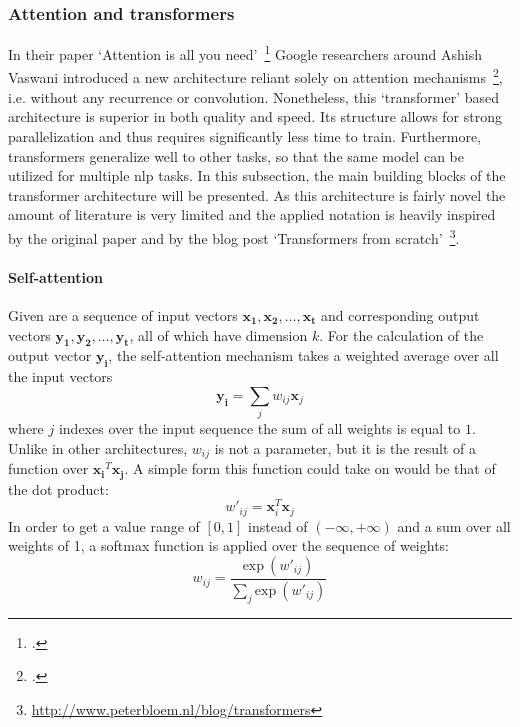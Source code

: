 \subsubsection{Attention and transformers}
\label{sub:attention_and_transformers}

In their paper `Attention is all you need'~\footcite{DBLP:journals/corr/VaswaniSPUJGKP17} Google researchers around Ashish Vaswani introduced a new architecture reliant solely on attention mechanisms~\footcite{DBLP:journals/corr/LinFSYXZB17}, i.e. without any recurrence or convolution. Nonetheless, this `transformer' based architecture is superior in both quality and speed. Its structure allows for strong parallelization and thus requires significantly less time to train. Furthermore, transformers generalize well to other tasks, so that the same model can be utilized for multiple \gls{nlp} tasks. In this subsection, the main building blocks of the transformer architecture will be presented. As this architecture is fairly novel the amount of literature is very limited and the applied notation is heavily inspired by the original paper and by the blog post `Transformers from scratch'~\footnote{\url{http://www.peterbloem.nl/blog/transformers}}.

\paragraph{Self-attention}
Given are a sequence of input vectors $ \boldsymbol{x_1}, \boldsymbol{x_2}, \dots, \boldsymbol{x_t} $ and corresponding output vectors $ \boldsymbol{y_1}, \boldsymbol{y_2}, \dots, \boldsymbol{y_t} $, all of which have dimension $ k $. For the calculation of the output vector $ \boldsymbol{y_i} $, the self-attention mechanism takes a weighted average over all the input vectors
\begin{equation}
	\boldsymbol{y_i} = \sum_j w_{ij} \boldsymbol{x}_j
\end{equation}
where $ j $ indexes over the input sequence the sum of all weights is equal to $ 1 $. Unlike in other architectures, $ w_{ij} $ is not a parameter, but it is the result of a function over $ \boldsymbol{x_i}^T \boldsymbol{x_j} $. A simple form this function could take on would be that of the dot product:
\begin{equation}
	w'_{ij} = \boldsymbol{x}_i^T \boldsymbol{x}_j
\end{equation}
In order to get a value range of $ [0, 1] $ instead of $ (-\infty, +\infty) $ and a sum over all weights of 1, a softmax function is applied over the sequence of weights:
\begin{equation}
	w_{ij} = \frac{\text{exp} \ (w'_{ij})}{\sum_j \text{exp} \ (w'_{ij})}
\end{equation}

